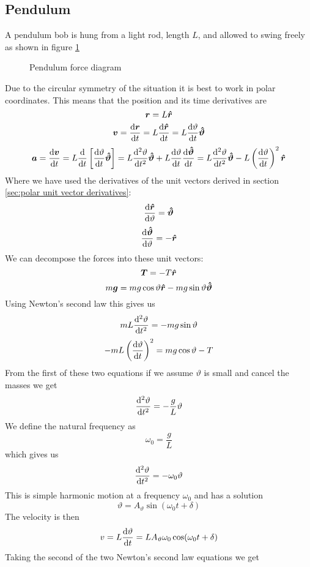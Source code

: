 \documentclass{article}
\begin{document}
    \subsection{Pendulum}\label{sec:pendulum}
    A pendulum bob is hung from a light rod, length \(L\), and allowed to swing freely as shown in figure \ref{fig:pendulum}
    \begin{figure}[ht]
        \centering
        \caption{Pendulum force diagram}
        \label{fig:pendulum}
    \end{figure}
    Due to the circular symmetry of the situation it is best to work in polar coordinates.
    This means that the position and its time derivatives are
    \[\bm{r} = L\bm{\hat{r}}\]
    \[\bm{v} = \dv{\bm{r}}{t} = L\dv{\bm{\hat{r}}}{t} = L\dv{\vartheta}{t}\bm{\hat{\vartheta}}\]
    \[\bm{a} = \dv{\bm{v}}{t} = L\dv{t}\left[\dv{\vartheta}{t}\bm{\hat{\vartheta}}\right] = L\dv[2]{\vartheta}{t}\bm{\hat{\vartheta}} + L\dv{\vartheta}{t}\dv{\bm{\hat{\vartheta}}}{t} = L\dv[2]{\vartheta}{t}\bm{\hat{\vartheta}} - L\left(\dv{\vartheta}{t}\right)^2\bm{\hat{r}}\]
    Where we have used the derivatives of the unit vectors derived in section \ref{sec:polar unit vector derivatives}:
    \[\dv{\bm{\hat{r}}}{\vartheta} = \bm{\hat{\vartheta}}\]
    \[\dv{\bm{\hat{\vartheta}}}{\vartheta} = -\bm{\hat{r}}\]
    We can decompose the forces into these unit vectors:
    \[\bm{T} = -T\bm{\hat{r}}\]
    \[m\bm{g} = mg\cos\vartheta\bm{\hat{r}} - mg\sin\vartheta\bm{\hat{\vartheta}}\]
    Using Newton's second law this gives us
    \[mL\dv[2]{\vartheta}{t} = -mg\sin\vartheta\]
    \[-mL\left(\dv{\vartheta}{t}\right)^2 = mg\cos\vartheta - T\]
    From the first of these two equations if we assume \(\vartheta\) is small and cancel the masses we get
    \[\dv[2]{\vartheta}{t} = -\frac{g}{L}\vartheta\]
    We define the natural frequency as
    \[\omega_0 = \frac{g}{L}\]
    which gives us
    \[\dv[2]{\vartheta}{t} = -\omega_0\vartheta\]
    This is simple harmonic motion at a frequency \(\omega_0\) and has a solution
    \[\vartheta = A_\vartheta\sin(\omega_0 t + \delta)\]
    The velocity is then
    \[v = L\dv{\vartheta}{t} = LA_\vartheta\omega_0\cos(\omega_0 t + \delta)\]
    Taking the second of the two Newton's second law equations we get
\end{document}
